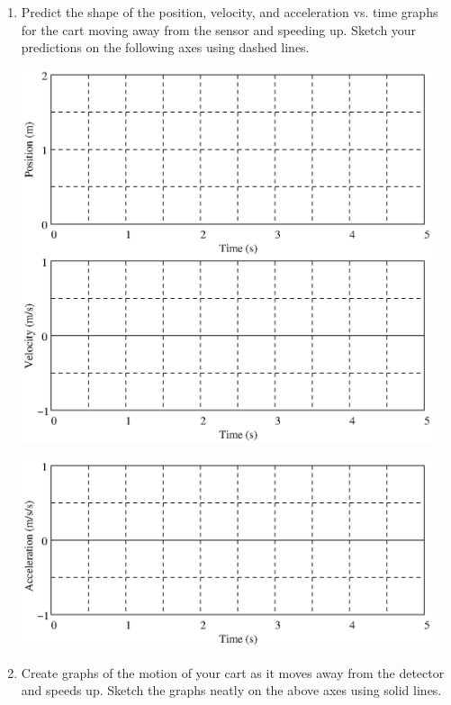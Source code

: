\begin{enumerate}

\item Predict the shape of the position, velocity, and acceleration vs. time graphs
for the cart moving away from the sensor and speeding up. Sketch your predictions
on the following axes using dashed lines.

\vspace{0.3cm}
{\par\centering \includegraphics[width=4.75in]{iqsRelatingMotion/changing_fig1.eps} \par}
\vspace{0.3cm}

\vspace{0.3cm}
{\par\centering \includegraphics[width=4.75in]{iqsRelatingMotion/changing_fig2.eps} \par}
\vspace{0.3cm}

\item Create graphs of the motion of your cart as it moves away from the detector
and speeds up. Sketch the graphs neatly on the above axes using solid lines.


\end{enumerate}
